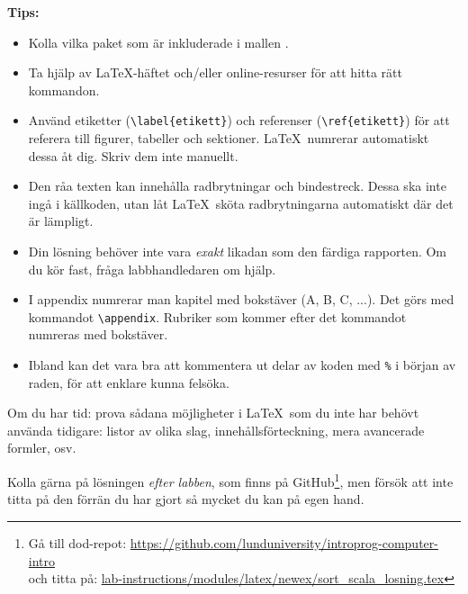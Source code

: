 \begin{Datorarbete}
    \smallskip

    \noindent\textbf{Tips:}
    \begin{itemize}
        \item Kolla vilka paket som är inkluderade i mallen .
        \item Ta hjälp av \LaTeX-häftet och/eller online-resurser för att hitta rätt kommandon.
        \item Använd etiketter (\verb/\label{etikett}/) och referenser (\verb/\ref{etikett}/) för att referera till figurer, tabeller och sektioner. \LaTeX\ numrerar automatiskt dessa åt dig. Skriv dem inte manuellt.
        \item Den råa texten kan innehålla radbrytningar och bindestreck. Dessa ska inte ingå i källkoden, utan låt \LaTeX\ sköta radbrytningarna automatiskt där det är lämpligt.
        \item Din lösning behöver inte vara \emph{exakt} likadan som den färdiga rapporten. Om du kör fast, fråga labbhandledaren om hjälp.
        \item I appendix numrerar man kapitel med bokstäver (A, B, C, ...). Det görs med kommandot \verb/\appendix/. Rubriker som kommer efter det kommandot numreras med bokstäver.
		\item Ibland kan det vara bra att kommentera ut delar av koden med \verb/%/ i början av raden, för att enklare kunna felsöka.
    \end{itemize}

	\item Om du har tid: prova sådana möjligheter i \LaTeX\ som du inte har behövt använda tidigare: listor av olika slag, innehållsförteckning, mera avancerade formler, osv.
	\item Kolla gärna på lösningen \emph{efter labben}, som finns på GitHub\footnote{Gå till dod-repot: \url{https://github.com/lunduniversity/introprog-computer-intro}\\
	och titta på: \url{lab-instructions/modules/latex/newex/sort_scala_losning.tex}}, men försök att inte titta på den förrän du har gjort så mycket du kan på egen hand.
\end{Datorarbete}

